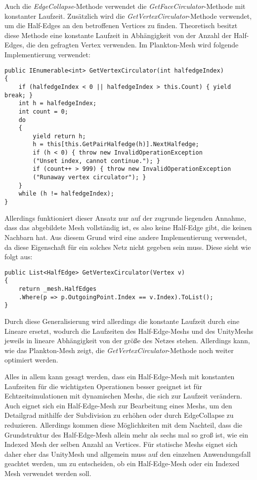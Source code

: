 Auch die \textit{EdgeCollapse}-Methode verwendet die \textit{GetFaceCirculator}-Methode mit konstanter Laufzeit. Zus\"atzlich wird die \textit{GetVertexCirculator}-Methode verwendet, um die Half-Edges an den betroffenen Vertices zu finden. Theoretisch besitzt diese Methode eine konstante Laufzeit in Abh\"angigkeit von der Anzahl der Half-Edges, die den gefragten Vertex verwenden. Im Plankton-Mesh \cite{Meshmash2017} wird folgende Implementierung verwendet:
\begin{lstlisting}
public IEnumerable<int> GetVertexCirculator(int halfedgeIndex)
{
	if (halfedgeIndex < 0 || halfedgeIndex > this.Count) { yield break; }
	int h = halfedgeIndex;
	int count = 0;
	do
	{
		yield return h;
		h = this[this.GetPairHalfedge(h)].NextHalfedge;
		if (h < 0) { throw new InvalidOperationException
		("Unset index, cannot continue."); }
		if (count++ > 999) { throw new InvalidOperationException
		("Runaway vertex circulator"); }
	}
	while (h != halfedgeIndex);
}
\end{lstlisting}
Allerdings funktioniert dieser Ansatz nur auf der zugrunde liegenden Annahme, dass das abgebildete Mesh vollst\"andig ist, es also keine Half-Edge gibt, die keinen Nachbarn hat. Aus diesem Grund wird eine andere Implementierung verwendet, da diese Eigenschaft f\"ur ein solches Netz nicht gegeben sein muss. Diese sieht wie folgt aus: 
\begin{lstlisting}
public List<HalfEdge> GetVertexCirculator(Vertex v)
{
	return _mesh.HalfEdges
	.Where(p => p.OutgoingPoint.Index == v.Index).ToList();
}
\end{lstlisting}
Durch diese Generalisierung wird allerdings die konstante Laufzeit durch eine Lineare ersetzt, wodurch die Laufzeiten des Half-Edge-Meshs und des UnityMeshs jeweils in lineare Abh\"angigkeit von der gr\"o{\ss}e des Netzes stehen. Allerdings kann, wie das Plankton-Mesh zeigt, die \textit{GetVertexCirculator}-Methode noch weiter optimiert werden. 

Alles in allem kann gesagt werden, dass ein Half-Edge-Mesh mit konstanten Laufzeiten f\"ur die wichtigsten Operationen besser geeignet ist f\"ur Echtzeitsimulationen mit dynamischen Meshs, die sich zur Laufzeit ver\"andern. Auch eignet sich ein Half-Edge-Mesh zur Bearbeitung eines Meshs, um den Detailgrad mithilfe der Subdivision zu erh\"ohen oder durch EdgeCollapse zu reduzieren. Allerdings kommen diese M\"oglichkeiten mit dem Nachteil, dass die Grundstruktur des Half-Edge-Mesh allein mehr als sechs mal so gro{\ss} ist, wie ein Indexed Mesh der selben Anzahl an Vertices. F\"ur statische Meshs eignet sich daher eher das UnityMesh und allgemein muss auf den einzelnen Anwendungsfall geachtet werden, um zu entscheiden, ob ein Half-Edge-Mesh oder ein Indexed Mesh verwendet werden soll.

